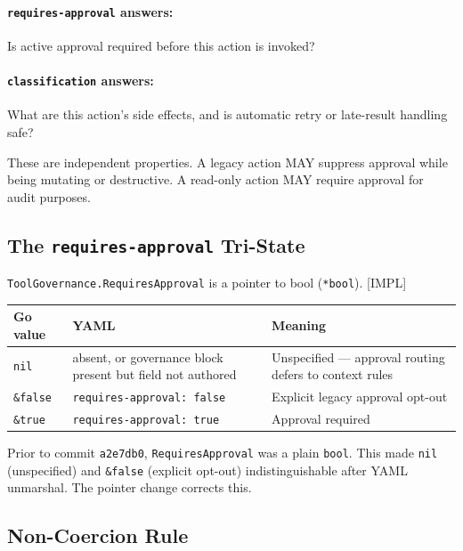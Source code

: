 \paragraph{\texttt{requires-approval} answers:} Is active approval required
before this action is invoked?

\paragraph{\texttt{classification} answers:} What are this action's side effects,
and is automatic retry or late-result handling safe?

\noindent These are independent properties.  A legacy action MAY suppress
approval while being mutating or destructive.  A read-only action MAY require
approval for audit purposes.

\subsection{The \texttt{requires-approval} Tri-State}
\label{subsec:rp-tristate}

\texttt{ToolGovernance.RequiresApproval} is a pointer to bool (\texttt{*bool}).
[IMPL]

\begin{center}
\begin{tabular}{lll}
\toprule
\textbf{Go value} & \textbf{YAML}                     & \textbf{Meaning} \\
\midrule
\texttt{nil}      & absent, or governance block present but field not authored
                  & Unspecified — approval routing defers to context rules \\
\texttt{\&false}  & \texttt{requires-approval: false}
                  & Explicit legacy approval opt-out \\
\texttt{\&true}   & \texttt{requires-approval: true}
                  & Approval required \\
\bottomrule
\end{tabular}
\end{center}

\noindent Prior to commit \texttt{a2e7db0}, \texttt{RequiresApproval} was a
plain \texttt{bool}.  This made \texttt{nil} (unspecified) and \texttt{\&false}
(explicit opt-out) indistinguishable after YAML unmarshal.  The pointer change
corrects this.

\subsection{Non-Coercion Rule}

